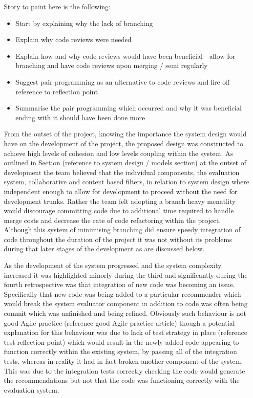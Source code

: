 \documentclass{l3proj}
\begin{document}
Story to paint here is the following:
\begin{itemize}
\item Start by explaining why the lack of branching
\item Explain why code reviews were needed
\item Explain how and why code reviews would have been beneficial - allow for branching and have code reviews upon merging / semi regularly
\item Suggest pair programming as an alternative to code reviews and fire off reference to reflection point
\item Summarise the pair programming which occurred and why it was beneficial ending with it should have been done more
\end{itemize}

From the outset of the project, knowing the importance the system design would have on the development of the project, the proposed design was constructed to achieve high levels of cohesion and low levels coupling within the system. As outlined in Section (reference to system design / models section) at the outset of development the team believed that the individual components, the evaluation system, collaborative and content based filters, in relation to system design where independent enough to allow for development to proceed without the need for development trunks. Rather the team felt adopting a branch heavy menatlity would discourage committing code due to additional time required to handle merge costs and decrease the rate of code refactoring within the project. Although this system of minimising branching did ensure speedy integration of code throughout the duration of the project it was not without its problems during that later stages of the development as are discussed below.

As the development of the system progressed and the system complexity increased it was highlighted minorly during the third and significantly during the fourth retrospective was that integration of new code was becoming an issue. Specifically that new code was being added to a particular recommender which would break the system evaluator component in addition to code was often being commit which was unfinished and being refined. Obviously such behaviour is not good Agile practice (reference good Agile practice article) though a potential explanation for this behaviour was due to lack of test strategy in place (reference test reflection point) which would result in the newly added code appearing to function correctly within the existing system, by passing all of the integration tests, whereas in reality it had in fact broken another component of the system. This was due to the integration tests correctly checking the code would generate the recommendations but not that the code was functioning correctly with the evaluation system.
\end{document}
